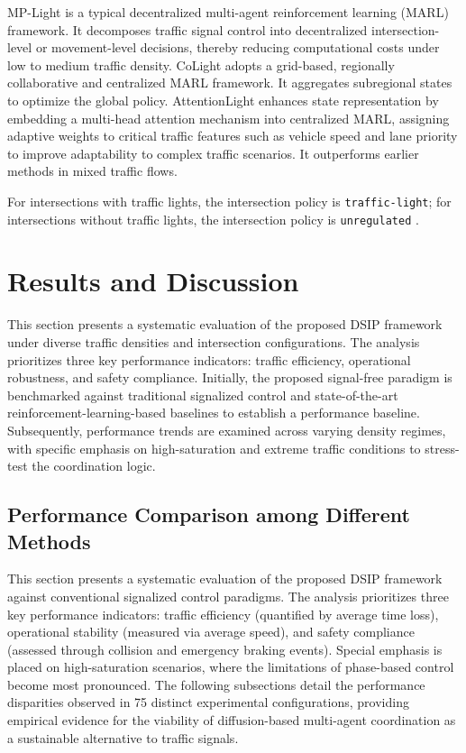 \documentclass[journal]{IEEEtran}
\begin{document}
MP-Light is a typical decentralized multi-agent reinforcement learning (MARL) framework. It decomposes traffic signal control into decentralized intersection-level or movement-level decisions, thereby reducing computational costs under low to medium traffic density. CoLight adopts a grid-based, regionally collaborative and centralized MARL framework. It aggregates subregional states to optimize the global policy. 
AttentionLight enhances state representation by embedding a multi-head attention mechanism into centralized MARL, assigning adaptive weights to critical traffic features such as vehicle speed and lane priority to improve adaptability to complex traffic scenarios. It outperforms earlier methods in mixed traffic flows.


For intersections with traffic lights, the intersection policy is \texttt{traffic-light}; for intersections without traffic lights, the intersection policy is \texttt{unregulated} \cite{PlainXMLSUMODocumentation}.


\section{Results and Discussion}

This section presents a systematic evaluation of the proposed DSIP framework under diverse traffic densities and intersection configurations. The analysis prioritizes three key performance indicators: traffic efficiency, operational robustness, and safety compliance. Initially, the proposed signal-free paradigm is benchmarked against traditional signalized control and state-of-the-art reinforcement-learning-based baselines to establish a performance baseline. Subsequently, performance trends are examined across varying density regimes, with specific emphasis on high-saturation and extreme traffic conditions to stress-test the coordination logic. 

\subsection{Performance Comparison among Different Methods}

This section presents a systematic evaluation of the proposed DSIP framework against conventional signalized control paradigms. The analysis prioritizes three key performance indicators: traffic efficiency (quantified by average time loss), operational stability (measured via average speed), and safety compliance (assessed through collision and emergency braking events). Special emphasis is placed on high-saturation scenarios, where the limitations of phase-based control become most pronounced. The following subsections detail the performance disparities observed in 75 distinct experimental configurations, providing empirical evidence for the viability of diffusion-based multi-agent coordination as a sustainable alternative to traffic signals.
\end{document}
